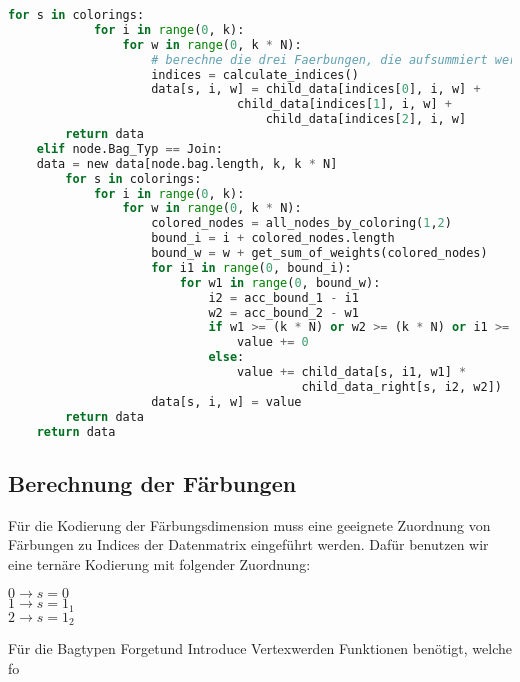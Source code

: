 \begin{svgraybox}
\begin{lstlisting}[language=python,label={code:pseudo}, caption=Pseudocode für das dynamische Programm]
        for s in colorings:
            for i in range(0, k):
                for w in range(0, k * N):
                    # berechne die drei Faerbungen, die aufsummiert werden
                    indices = calculate_indices()
                    data[s, i, w] = child_data[indices[0], i, w] +
                    		    child_data[indices[1], i, w] +
                                    child_data[indices[2], i, w]
        return data
    elif node.Bag_Typ == Join:
	data = new data[node.bag.length, k, k * N]
        for s in colorings:
            for i in range(0, k):
                for w in range(0, k * N):
                    colored_nodes = all_nodes_by_coloring(1,2)
                    bound_i = i + colored_nodes.length
                    bound_w = w + get_sum_of_weights(colored_nodes)
                    for i1 in range(0, bound_i):
                        for w1 in range(0, bound_w):
                            i2 = acc_bound_1 - i1
                            w2 = acc_bound_2 - w1
                            if w1 >= (k * N) or w2 >= (k * N) or i1 >= k or i2 >= k:
                                value += 0
                            else:
                                value += child_data[s, i1, w1] *   
                                         child_data_right[s, i2, w2])
                    data[s, i, w] = value
        return data
    return data

\end{lstlisting}
\end{svgraybox}

\subsection{Berechnung der Färbungen}
\label{ssec:colors}
Für die Kodierung der Färbungsdimension muss eine geeignete Zuordnung von Färbungen zu Indices der Datenmatrix eingeführt werden. Dafür benutzen wir eine ternäre Kodierung mit folgender Zuordnung:
\begin{center}
$0 \rightarrow s=0$\\
$1 \rightarrow s=1_1$\\
$2 \rightarrow s=1_2$\\
\end{center}
Für die Bagtypen \glqq Forget\grqq und \glqq Introduce Vertex\grqq werden Funktionen benötigt, welche fo
